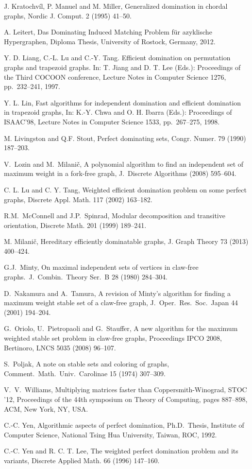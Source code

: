 \documentclass[]{elsarticle}
\begin{document}
\begin{thebibliography}{10}
J. Kratochv\'il, P. Manuel and M. Miller, Generalized domination in chordal graphs,
Nordic J. Comput. 2 (1995) 41--50.

A. Leitert, Das Dominating Induced Matching Problem f\"ur azyklische Hypergraphen,
Diploma Thesis, University of Rostock, Germany, 2012.

Y. D. Liang, C.-L. Lu and C.-Y. Tang. Efficient domination on permutation graphs
and trapezoid graphs. In: T. Jiang and D. T. Lee (Eds.): Proceedings of the Third COCOON conference,
Lecture Notes in Computer Science 1276, pp.~232--241, 1997.

Y. L. Lin, Fast algorithms for independent domination and efficient domination in trapezoid graphs,
In: K.-Y. Chwa and O. H. Ibarra (Eds.): Proceedings of ISAAC'98, Lecture Notes in Computer Science 1533, pp.~267--275, 1998.

M. Livingston and Q.F. Stout, Perfect dominating sets, Congr. Numer. 79 (1990) 187--203.

V.~Lozin and M.~Milani\v c, A polynomial algorithm to
find an independent set of maximum weight in a fork-free graph,
J.~Discrete Algorithms (2008) 595--604.

 C. L. Lu and C. Y. Tang,
Weighted efficient domination problem on some perfect graphs,
Discrete Appl. Math. 117 (2002)  163--182.

R.M.~McConnell and J.P.~Spinrad,
Modular decomposition and transitive orientation,
Discrete Math. 201 (1999) 189--241.

M. Milani\v c, Hereditary efficiently dominatable graphs,
J. Graph Theory 73 (2013) 400--424.

G.J.~Minty, On maximal independent sets of vertices in claw-free
graphs.~J.~Combin.~Theory Ser.~B 28 (1980) 284--304.

D.~Nakamura and A.~Tamura, A revision of Minty's algorithm for finding a
maximum weight stable set of a claw-free graph, J.~Oper.~Res.~Soc.~Japan 44
(2001) 194--204.

G.~Oriolo, U.~Pietropaoli and G.~Stauffer, A new algorithm for the
maximum weighted stable set problem in claw-free graphs,
Proceedings IPCO 2008, Bertinoro,
LNCS 5035 (2008) 96--107.

S.~Poljak, A note on stable sets and coloring of graphs,
Comment.~Math.~Univ.~Carolinae 15 (1974) 307--309.

V.~V.~Williams,
Multiplying matrices faster than Coppersmith-Winograd, STOC '12,
Proceedings of the 44th symposium on Theory of Computing, pages 887--898, ACM, New York, NY, USA.

C.-C. Yen, Algorithmic aspects of perfect domination, Ph.D.~Thesis, Institute of Computer Science, National Tsing
Hua University, Taiwan, ROC, 1992.

C.-C. Yen and R. C. T. Lee,
The weighted perfect domination problem and its variants,
Discrete Applied Math. 66 (1996) 147--160.
\end{thebibliography}
\end{document}

